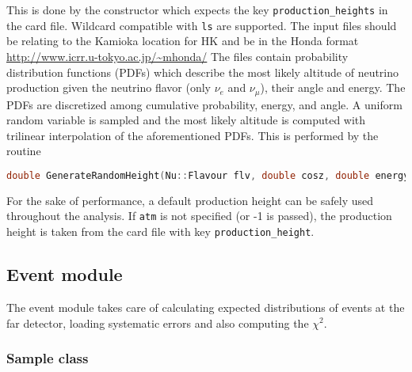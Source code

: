 \documentclass[a4paper, 11pt]{article}
\begin{document}
This is done by the constructor which expects the key \texttt{production\_heights} in the card file.
Wildcard compatible with \texttt{ls} are supported.
The input files should be relating to the Kamioka location for HK and be in the Honda format \url{http://www.icrr.u-tokyo.ac.jp/~mhonda/}
The files contain probability distribution functions (PDFs) which describe the most likely altitude of neutrino production given %
the neutrino flavor (only $\nu_e$ and $\nu_\mu$), their angle and energy.
The PDFs are discretized among cumulative probability, energy, and angle.
A uniform random variable is sampled and the most likely altitude is computed with trilinear interpolation of the aforementioned PDFs.
This is performed by the routine 
\begin{lstlisting}[language=C++]
    double GenerateRandomHeight(Nu::Flavour flv, double cosz, double energy);
\end{lstlisting}
For the sake of performance, a default production height can be safely used throughout the analysis.
If \texttt{atm} is not specified (or -1 is passed), the production height is taken from the card file %
with key \texttt{production\_height}.


\subsection{Event module}
\label{sec:event}

The event module takes care of calculating expected distributions of events at the far detector, %
loading systematic errors and also computing the $\chi^2$.

\subsubsection{Sample class}
\label{sec:sample}
\end{document}
